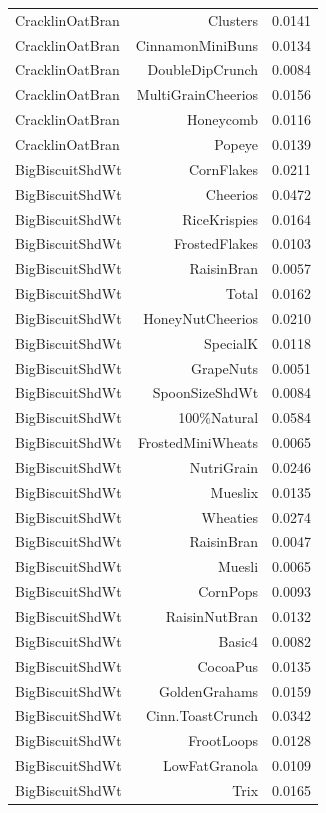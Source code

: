 \begin{longtable}{@{}lrr@{}}
CracklinOatBran & Clusters & 0.0141 \\
CracklinOatBran & CinnamonMiniBuns & 0.0134 \\
CracklinOatBran & DoubleDipCrunch & 0.0084 \\
CracklinOatBran & MultiGrainCheerios & 0.0156 \\
CracklinOatBran & Honeycomb & 0.0116 \\
CracklinOatBran & Popeye & 0.0139 \\
BigBiscuitShdWt & CornFlakes & 0.0211 \\
BigBiscuitShdWt & Cheerios & 0.0472 \\
BigBiscuitShdWt & RiceKrispies & 0.0164 \\
BigBiscuitShdWt & FrostedFlakes & 0.0103 \\
BigBiscuitShdWt & RaisinBran & 0.0057 \\
BigBiscuitShdWt & Total & 0.0162 \\
BigBiscuitShdWt & HoneyNutCheerios & 0.0210 \\
BigBiscuitShdWt & SpecialK & 0.0118 \\
BigBiscuitShdWt & GrapeNuts & 0.0051 \\
BigBiscuitShdWt & SpoonSizeShdWt & 0.0084 \\
BigBiscuitShdWt & 100\%Natural & 0.0584 \\
BigBiscuitShdWt & FrostedMiniWheats & 0.0065 \\
BigBiscuitShdWt & NutriGrain & 0.0246 \\
BigBiscuitShdWt & Mueslix & 0.0135 \\
BigBiscuitShdWt & Wheaties & 0.0274 \\
BigBiscuitShdWt & RaisinBran & 0.0047 \\
BigBiscuitShdWt & Muesli & 0.0065 \\
BigBiscuitShdWt & CornPops & 0.0093 \\
BigBiscuitShdWt & RaisinNutBran & 0.0132 \\
BigBiscuitShdWt & Basic4 & 0.0082 \\
BigBiscuitShdWt & CocoaPus & 0.0135 \\
BigBiscuitShdWt & GoldenGrahams & 0.0159 \\
BigBiscuitShdWt & Cinn.ToastCrunch & 0.0342 \\
BigBiscuitShdWt & FrootLoops & 0.0128 \\
BigBiscuitShdWt & LowFatGranola & 0.0109 \\
BigBiscuitShdWt & Trix & 0.0165 \\

\end{longtable}
